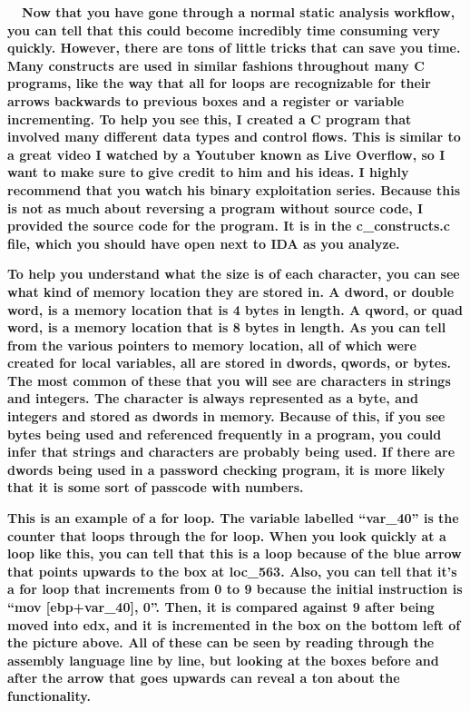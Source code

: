 \documentclass[letterpaper]{article}
\newcommand{\sitfig}[3]{
\begin{figure}[H]
\centering
\makebox[\textwidth][c]{
#2
}
\label{#1}
\end{figure}
}
\newcommand{\sitgfx}[4][scale=1.0]{
\sitfig{#3}{\texttt{[image: \#2]}}{#4}
}
\begin{document}
\textbf{ \ \ Now that you have gone through a normal static analysis workflow, you can tell that this could become
incredibly time consuming very quickly. However, there are tons of little tricks that can save you time. Many
constructs are used in similar fashions throughout many C programs, like the way that all for loops are recognizable
for their arrows backwards to previous boxes and a register or variable incrementing. To help you see this, I created a
C program that involved many different data types and control flows. This is similar to a great video I watched by a
Youtuber known as Live Overflow, so I want to make sure to give credit to him and his ideas. I highly recommend that
you watch his binary exploitation series. Because this is not as much about reversing a program without source code, I
provided the source code  for the program. It is in the c\_constructs.c file, which you should have open next to IDA as
you analyze.}

  
\sitgfx[width=3in,height=4.1252in]{reversing-img066.png}{fig:unk}{TODO CAPTION}
 

\textbf{To help you understand what the size is of each character, you can see what kind of memory location they are
stored in. A dword, or double word, is a memory location that is 4 bytes in length. A qword, or quad word, is a memory
location that is 8 bytes in length. As you can tell from the various pointers to memory location, all of which were
created for local variables, all are stored in dwords, qwords, or bytes. The most common of these that you will see are
characters in strings and integers. The character is always represented as a byte, and integers and stored as dwords in
memory. Because of this, if you see bytes being used and referenced frequently in a program, you could infer that
strings and characters are probably being used. If there are dwords being used in a password checking program, it is
more likely that it is some sort of passcode with numbers.}

  
\sitgfx[width=6.4898in,height=3.802in]{reversing-img067.png}{fig:unk}{TODO CAPTION}
 

\textbf{This is an example of a for loop. The variable labelled ``var\_40'' is the counter that loops through the for
loop. When you look quickly at a loop like this, you can tell that this is a loop because of the blue arrow that points
upwards to the box at loc\_563. Also, you can tell that it's a for loop that increments from 0 to 9 because the initial
instruction is ``mov [ebp+var\_40], 0''. Then, it is compared against 9 after being moved into edx, and it is
incremented in the box on the bottom left of the picture above. All of these can be seen by reading through the
assembly language line by line, but looking at the boxes before and after the arrow that goes upwards can reveal a ton
about the functionality.}
\end{document}
